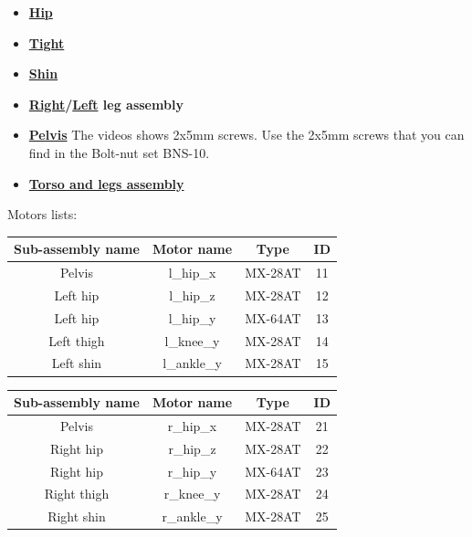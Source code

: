 \documentclass{article}
\begin{document}
\begin{itemize}
\item \textbf{\href{https://github.com/poppy-project/Poppy-lightweight-biped-legs/blob/master/doc/subassemblies/left\_hip\_assembly\_instructions.md}{Hip}}
\item \textbf{\href{https://github.com/poppy-project/Poppy-lightweight-biped-legs/blob/master/doc/subassemblies/left\_thigh\_assembly\_instructions.md}{Tight}}
\item \textbf{\href{https://github.com/poppy-project/Poppy-lightweight-biped-legs/blob/master/doc/subassemblies/left\_shin\_assembly\_instructions.md}{Shin}}
\item \textbf{\href{https://github.com/poppy-project/Poppy-lightweight-biped-legs/blob/master/doc/subassemblies/right\_leg\_assembly\_instructions.md}{Right}/\href{https://github.com/poppy-project/Poppy-lightweight-biped-legs/blob/master/doc/subassemblies/left\_leg\_assembly\_instructions.md}{Left} leg assembly}
\item \textbf{\href{https://github.com/poppy-project/Poppy-lightweight-biped-legs/blob/master/doc/subassemblies/pelvis\_assembly\_instructions.md}{Pelvis}} The videos shows \diameter 2x5mm screws. Use the \diameter 2x5mm screws that you can find in the Bolt-nut set BNS-10.
\item \textbf{\href{https://github.com/poppy-project/poppy-humanoid/blob/master/hardware/doc/Poppy\_Humanoid\_assembly\_instructions.md}{Torso and legs assembly}}
\end{itemize}


Motors lists:

\begin{center}

\begin{tabular}{|c|c|c|c|}
\hline 
Sub-assembly name & Motor name & Type & ID \\ 
\hline 
Pelvis & l\_hip\_x & MX-28AT & 11 \\ 
\hline 
Left hip & l\_hip\_z & MX-28AT & 12 \\ 
\hline 
Left hip & l\_hip\_y & MX-64AT & 13 \\ 
\hline 
Left thigh & l\_knee\_y & MX-28AT & 14 \\ 
\hline 
Left shin & l\_ankle\_y & MX-28AT & 15\\
\hline 
\end{tabular} 
\end{center}

\begin{center}

\begin{tabular}{|c|c|c|c|}
\hline 
Sub-assembly name & Motor name & Type & ID \\ 
\hline 
Pelvis & r\_hip\_x & MX-28AT & 21 \\ 
\hline 
Right hip & r\_hip\_z & MX-28AT & 22 \\ 
\hline 
Right hip & r\_hip\_y & MX-64AT & 23 \\ 
\hline 
Right thigh & r\_knee\_y & MX-28AT & 24 \\ 
\hline 
Right shin & r\_ankle\_y & MX-28AT & 25\\
\hline 
\end{tabular} 
\end{center}
\end{document}
